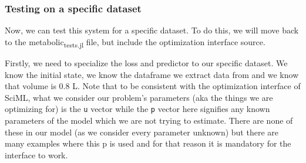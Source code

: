 \documentclass[11pt]{article}
\begin{document}
\subsubsection{Testing on a specific dataset}
\label{sec:orgd93cfb4}
Now, we can test this system for a specific dataset. To do this, we will move back to the metabolic\textsubscript{tests.jl} file, but include the optimization interface source.

Firstly, we need to specialize the loss and predictor to our specific dataset. We know the initial state, we know the dataframe we extract data from and we know that volume is 0.8 L. Note that to be consistent with the optimization interface of SciML, what we consider our problem's parameters (aka the things we are optimizing for) is the \texttt{u} vector while the \texttt{p} vector here signifies any known parameters of the model which we are not trying to estimate. There are none of these in our model (as we consider every parameter unknown) but there are many examples where this p is used and for that reason it is mandatory for the interface to work.
\end{document}
